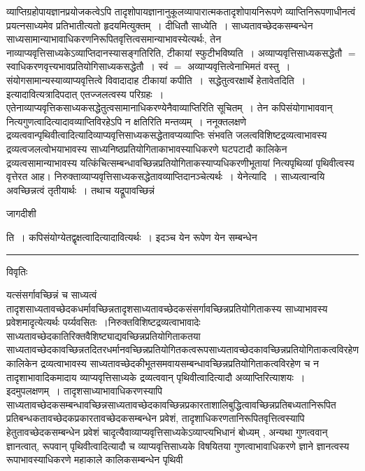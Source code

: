 \documentclass[10pt, openany]{book}
\begin{document}
{व्याप्तिग्रहोपायज्ञानप्रयोजकत्वेऽपि तादृशोपायज्ञानानुकूलव्यापारात्मकतादृशोपायनिरूपणे व्याप्तिनिरूपणाधीनत्वं प्रयत्नसाध्यमेव प्रतिभातीत्यतो हृदयमित्युक्तम्~। दीधितौ {\la साध्येति~।} साध्यतावच्छेदकसम्बन्धेन साध्यसामान्याभावाधिकरणनिरूपितवृत्तित्वसमान्याभावस्येत्यर्थः, तेन नाव्याप्यवृत्तिसाध्यकेऽव्याप्तिदानस्यासङ्गतिरिति, टीकायां
स्फुटीभविष्यति~। अव्याप्यवृत्तिसाध्यकसद्धेतौ $=$ स्वाधिकरणवृत्त्यभावप्रतियोगिसाध्यकसद्धेतौ~। स्वं $=$ अव्याप्यवृत्तित्वेनाभिमतं वस्तु~। संयोगसामान्यस्याव्याप्यवृत्तित्वे
विवादादाह टीकायां {\la कपीति~।}~सद्धेतुत्वरक्षार्थे हेतावेतदिति~। इत्यादावित्यत्रादिपदात् एतज्जलत्वस्य परिग्रहः~।
एतेनाव्याप्यवृत्तिकसाध्यकसद्धेतुत्वसामानाधिकरण्येनैवाव्याप्तिरिति सूचितम्~। तेन कपिसंयोगाभाववान् नित्यगुणत्वादित्यादावव्याप्तिविरहेऽपि न क्षतिरिति मन्तव्यम्~। ननूक्तलक्षणे द्रव्यत्ववान्पृथिवीत्वादित्यादिव्याप्यवृत्तिसाध्यकसद्धेतावप्यव्याप्तिः संभवति जलत्वविशिष्टद्रव्यत्वाभावस्य द्रव्यत्वजलत्वोभयाभावस्य
साध्यनिष्ठप्रतियोगिताकाभावस्याधिकरणे घटपटादौ कालिकेन द्रव्यत्वसामान्याभावस्य यत्किंचित्सम्बन्धावच्छिन्नप्रतियोगिताकस्याप्यधिकरणीभूतायां नित्यपृथिव्यां पृथिवीत्वस्य
वृत्तेरत आह। निरुक्ताव्याप्यवृत्तिसाध्यकसद्धेतावव्याप्तिदानञ्चेत्यर्थः~। येनेत्यादि~। साध्यत्वान्वयि अवच्छिन्नत्वं तृतीयार्थः~। तथाच यद्रूपावच्छिन्नं
\newpage
\begin{center} जागदीशी \end{center}
{\la ति~। कपिसंयोग्येतद्वृक्षत्वादित्यादावित्यर्थः~। इदञ्च येन रूपेण येन
सम्बन्धेन}\\
\hrule
 \begin{center}     विवृतिः \end{center} 
यत्संसर्गावच्छिन्नं च साध्यत्वं तादृशसाध्यतावच्छेदकधर्मावच्छिन्नतादृशसाध्यतावच्छेदकसंसर्गावच्छिन्नप्रतियोगिताकस्य साध्याभावस्य प्रवेशमादृत्येत्यर्थः पर्य्यवसितः~।निरुक्तविशिष्टद्रव्यत्वाभावादेः साध्यतावच्छेदकातिरिक्तवैशिष्ट्याद्यवच्छिन्नप्रतियोगिताकतया साध्यतावच्छेदकावच्छिन्नतदितरधर्मानवच्छिन्नप्रतियोगितकत्वरूपसाध्यतावच्छेदकावच्छिन्नप्रतियोगिताकत्वविरहेण कालिकेन द्रव्यत्वाभावस्य साध्यतावच्छेदकीभूतसमवायसम्बन्धावच्छिन्नप्रतियोगिताकत्वविरहेण च न तादृशाभावादिकमादाय व्याप्यवृत्तिसाध्यके द्रव्यत्ववान् पृथिवीत्वादित्यादौ
अव्याप्तिरित्याशयः~। इदमुपलक्षणम्~। तादृशसाध्याभावाधिकरणस्यापि    साध्यतावच्छेदकसम्बन्धावच्छिन्नसाध्यतावच्छेदकावच्छिन्नप्रकारताशालिबुद्धित्वावच्छिन्नप्रतिबध्यतानिरूपित प्रतिबन्धकतावच्छेदकप्रकारतावच्छेदकसम्बन्धेन
प्रवेशं, तादृशाधिकरणतानिरूपितवृत्तित्वस्यापि हेतुतावच्छेदकसम्बन्धेन प्रवेशं चादृत्यैवाव्याप्यवृत्तिसाध्यकेऽव्याप्त्यभिधानं बोध्यम् , अन्यथा गुणत्ववान्
ज्ञानत्वात्, रूपवान् पृथिवीत्वादित्यादौ च व्याप्यवृत्तिसाध्यके विषयितया गुणत्वाभावाधिकरणे ज्ञाने ज्ञानत्वस्य रूपाभावस्याधिकरणे महाकाले कालिकसम्बन्धेन पृथिवी
}
\end{document}
